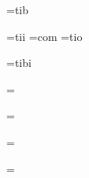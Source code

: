 \font\tenbf=tib %

\font\tenit=tii %
\font\tentt=com %
\font\tensl=tio %

\font\tenbi=tibi %




\ifx\itfam\undefined\else\textfont\itfam=\tenit\fi

\ifx\slfam\undefined\else\textfont\slfam=\tensl\fi



\ifx\ttfam\undefined\else\textfont\ttfam=\tentt\fi


\ifx\bifam\undefined\else\textfont\bifam=\tenbi\fi

